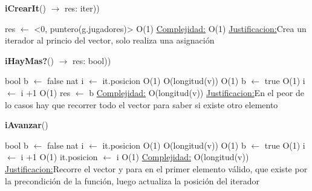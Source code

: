 \begin{Algoritmos}


\begin{algorithm}[H]{\textbf{iCrearIt}() $\to$ res: iter))}
	\begin{algorithmic}[1]
		\State res $\gets$ <0, puntero(g.jugadores)> \Comment O(1)
		\medskip
		\Statex \underline{Complejidad:} O(1)
		\Statex \underline{Justificacion:}Crea un iterador al princio del vector, solo 
		realiza una asignación  
	\end{algorithmic}
\end{algorithm}

\begin{algorithm}[H]{\textbf{iHayMas?}() $\to$ res: bool))}
	\begin{algorithmic}[1]
		\State bool b $\gets$ false
		\State nat i $\gets$ it.posicion \Comment O(1)
		 \Comment O(longitud(v))
			 \Comment O(1)
				\State b $\gets$ true \Comment O(1)
			\EndIf
		\State i $\gets$ i +1 \Comment O(1)		
		\EndWhile
		\State res $\gets$ b
		\medskip
		\Statex \underline{Complejidad:} O(longitud(v))
		\Statex \underline{Justificacion:}En el peor de lo casos hay que recorrer todo el vector para saber si existe otro elemento

\end{algorithmic}
\end{algorithm}	
		
\begin{algorithm}[H]{\textbf{iAvanzar}()}
	\begin{algorithmic}[1]
		\State bool b $\gets$ false
		\State nat i $\gets$ it.posicion \Comment O(1)
		 \Comment O(longitud(v))
			 \Comment O(1)
				\State b $\gets$ true \Comment O(1)
			\EndIf
		\State i $\gets$ i +1 \Comment O(1)		
		\EndWhile
		\State it.posicion $\gets$ i \Comment O(1)
		\medskip
		\Statex \underline{Complejidad:} O(longitud(v))
		\Statex \underline{Justificacion:}Recorre el vector y para en el primer elemento válido, que existe por la precondición de la función, luego actualiza la posición del iterador  
	\end{algorithmic}
\end{algorithm}


\end{Algoritmos}

